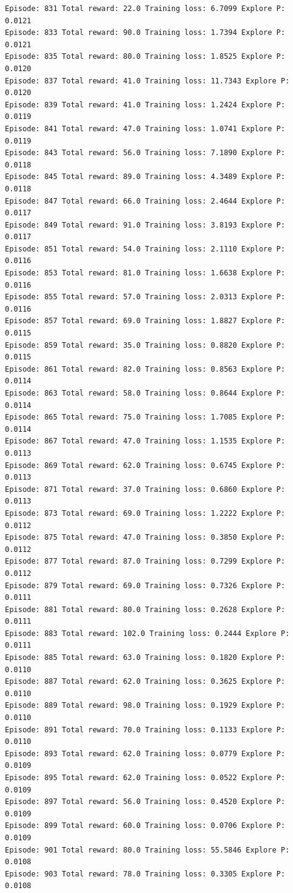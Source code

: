 \documentclass[11pt]{article}
\begin{document}
\begin{Verbatim}[commandchars=\\\{\}]
Episode: 831 Total reward: 22.0 Training loss: 6.7099 Explore P: 0.0121
Episode: 833 Total reward: 90.0 Training loss: 1.7394 Explore P: 0.0121
Episode: 835 Total reward: 80.0 Training loss: 1.8525 Explore P: 0.0120
Episode: 837 Total reward: 41.0 Training loss: 11.7343 Explore P: 0.0120
Episode: 839 Total reward: 41.0 Training loss: 1.2424 Explore P: 0.0119
Episode: 841 Total reward: 47.0 Training loss: 1.0741 Explore P: 0.0119
Episode: 843 Total reward: 56.0 Training loss: 7.1890 Explore P: 0.0118
Episode: 845 Total reward: 89.0 Training loss: 4.3489 Explore P: 0.0118
Episode: 847 Total reward: 66.0 Training loss: 2.4644 Explore P: 0.0117
Episode: 849 Total reward: 91.0 Training loss: 3.8193 Explore P: 0.0117
Episode: 851 Total reward: 54.0 Training loss: 2.1110 Explore P: 0.0116
Episode: 853 Total reward: 81.0 Training loss: 1.6638 Explore P: 0.0116
Episode: 855 Total reward: 57.0 Training loss: 2.0313 Explore P: 0.0116
Episode: 857 Total reward: 69.0 Training loss: 1.8827 Explore P: 0.0115
Episode: 859 Total reward: 35.0 Training loss: 0.8820 Explore P: 0.0115
Episode: 861 Total reward: 82.0 Training loss: 0.8563 Explore P: 0.0114
Episode: 863 Total reward: 58.0 Training loss: 0.8644 Explore P: 0.0114
Episode: 865 Total reward: 75.0 Training loss: 1.7085 Explore P: 0.0114
Episode: 867 Total reward: 47.0 Training loss: 1.1535 Explore P: 0.0113
Episode: 869 Total reward: 62.0 Training loss: 0.6745 Explore P: 0.0113
Episode: 871 Total reward: 37.0 Training loss: 0.6860 Explore P: 0.0113
Episode: 873 Total reward: 69.0 Training loss: 1.2222 Explore P: 0.0112
Episode: 875 Total reward: 47.0 Training loss: 0.3850 Explore P: 0.0112
Episode: 877 Total reward: 87.0 Training loss: 0.7299 Explore P: 0.0112
Episode: 879 Total reward: 69.0 Training loss: 0.7326 Explore P: 0.0111
Episode: 881 Total reward: 80.0 Training loss: 0.2628 Explore P: 0.0111
Episode: 883 Total reward: 102.0 Training loss: 0.2444 Explore P: 0.0111
Episode: 885 Total reward: 63.0 Training loss: 0.1820 Explore P: 0.0110
Episode: 887 Total reward: 62.0 Training loss: 0.3625 Explore P: 0.0110
Episode: 889 Total reward: 98.0 Training loss: 0.1929 Explore P: 0.0110
Episode: 891 Total reward: 70.0 Training loss: 0.1133 Explore P: 0.0110
Episode: 893 Total reward: 62.0 Training loss: 0.0779 Explore P: 0.0109
Episode: 895 Total reward: 62.0 Training loss: 0.0522 Explore P: 0.0109
Episode: 897 Total reward: 56.0 Training loss: 0.4520 Explore P: 0.0109
Episode: 899 Total reward: 60.0 Training loss: 0.0706 Explore P: 0.0109
Episode: 901 Total reward: 80.0 Training loss: 55.5846 Explore P: 0.0108
Episode: 903 Total reward: 78.0 Training loss: 0.3305 Explore P: 0.0108

\end{Verbatim}
\end{document}

